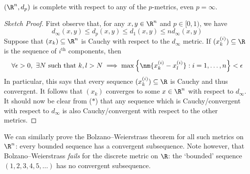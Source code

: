 \begin{thm}
$(\R^n,d_p)$ is complete with respect to any of the $p$-metrics, even $p=\infty$.
\end{thm}

\begin{proof}[Sketch Proof]
First observe that, for any $x,y\in\R^n$ and $p\in[0,1)$, we have
\[d_\infty(x,y)\le d_p(x,y)\le d_1(x,y)\le nd_\infty(x,y)\tag*{($\ast$)}\]
Suppose that $(x_k)\subseteq\R^n$ is Cauchy with respect to the $d_\infty$ metric. If $(x^{(i)}_k)\subseteq\R$ is the sequence of $i^\text{th}$ components, then
\[\forall \epsilon>0,\ \exists N\text{ such that }k,l>N\implies \max\left\{\nm{x^{(i)}_k-x^{(i)}_l}:i=1,\ldots,n\right\}<\epsilon\]
In particular, this says that every sequence $(x^{(i)}_k)\subseteq\R$ is Cauchy and thus convergent. It follows that $(x_k)$ converges to some $x\in\R^n$ with respect to $d_\infty$.\\
It should now be clear from ($\ast$) that any sequence which is Cauchy/convergent with respect to $d_\infty$ is also Cauchy/convergent with respect to the other metrics.
\end{proof}

We can similarly prove the Bolzano--Weierstrass theorem for all such metrics on $\R^n$: every bounded sequence has a convergent subsequence. Note however, that Bolzano--Weierstrass \emph{fails} for the discrete metric on $\R$: the `bounded' sequence $(1,2,3,4,5,\ldots)$ has no convergent subsequence.%


